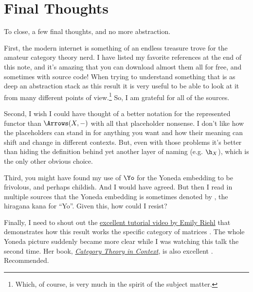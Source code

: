 \section{Final Thoughts}

To close, a few final thoughts, and no more abstraction.

First, the modern internet is something of an endless treasure trove for the amateur category theory nerd.
I have listed my favorite references at the end of this note, and it's amazing that you can download
almost them all for free, and sometimes with source code! When trying to understand something that is as 
deep an abstraction stack as this result it is very useful to be able to look at it from many different
points of view.\footnote{Which, of course, is very much in the spirit of the subject matter.}
So, I am grateful for all of the sources. 

Second, I wish I could have thought of a better notation for the represented functor
than $\Arrows(X,-)$ with all that placeholder nonsense. I don't like how the placeholders
can stand in for anything you want and how their meaning can shift and change in different contexts.
But, even with those problems it's better than hiding the definition behind yet another
layer of naming (e.g. $\h_X$), which is the only other obvious choice. 

Third, you might have found my use of $\Yo$ for the Yoneda embedding to be frivolous, and perhaps
childish. And I would have agreed. But then I read in multiple sources that
the Yoneda embedding is sometimes denoted by \!\!\yo, the hiragana kana for ``Yo''.
Given this, how could I resist?

Finally, I need to shout out the 
\href{https://www.youtube.com/watch?v=SsgEvrDFJsM}{excellent tutorial video by Emily Riehl} 
that demonstrates how this result works
the specific category of matrices \cite{Riehl2020}. The whole Yoneda picture suddenly
became more clear while I was watching this talk the second time.
Her book, \href{https://emilyriehl.github.io/files/context.pdf}{\it Category
Theory in Context}, is also excellent \cite{Riehl2016}. Recommended.

\newpage

